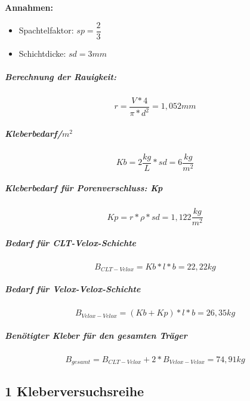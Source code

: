 \documentclass[12 pt,a4 paper ]{scrreprt}
\begin{document}
\textbf{Annahmen:}

\begin{itemize}
\item Spachtelfaktor:	$sp=\dfrac{2}{3}$
\item Schichtdicke:		$sd=3mm$
\end{itemize}
 

\subparagraph{Berechnung der Rauigkeit:}
\begin{equation}
r=\dfrac{V*4}{\pi*d^{2}}=1,052 mm
\end{equation}

\subparagraph{Kleberbedarf/$m^{2}$}

\begin{equation}
Kb= 2\dfrac{kg}{L}*sd=6\dfrac{kg}{m^{2}}
\end{equation}

\subparagraph{Kleberbedarf für Porenverschluss: Kp}

\begin{equation}
Kp=r*\rho*sd= 1,122\dfrac{kg}{m^{2}}
\end{equation}

\subparagraph{Bedarf für CLT-Velox-Schichte}

\begin{equation}
B_{CLT-Velox}=Kb*l*b=22,22 kg
\end{equation}

\subparagraph{Bedarf für Velox-Velox-Schichte}

\begin{equation}
B_{Velox-Velox}=(Kb+Kp)*l*b=26,35 kg
\end{equation}


\subparagraph{Benötigter Kleber für den gesamten Träger}

\begin{equation}
B_{gesamt}=B_{CLT-Velox}+2*B_{Velox-Velox}=74,91 kg
\end{equation}




\subsection{1 Kleberversuchsreihe}
\end{document}
